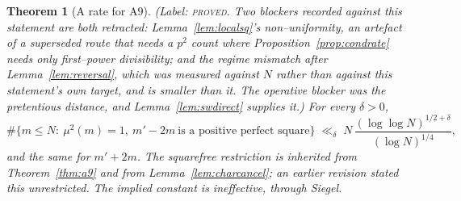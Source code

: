\documentclass[11pt]{article}
\newtheorem{theorem}{Theorem}[section]
\theoremstyle{definition}
\begin{document}
\begin{theorem}[A rate for $\mathrm{A}9$]\label{cor:a9rate}
\textup{(Label: \textsc{proved}. Two blockers recorded against this statement are both retracted: Lemma~\ref{lem:localsq}'s
non--uniformity, an artefact of a superseded route that needs a $p^2$ count where
Proposition~\ref{prop:condrate} needs only first--power divisibility; and the regime mismatch after
Lemma~\ref{lem:reversal}, which was measured against $N$ rather than against this statement's own
target, and is smaller than it. The operative blocker was the pretentious distance, and
Lemma~\ref{lem:swdirect} supplies it.)}
For every $\delta>0$,
\[ \#\{m\le N:\ \mu^2(m)=1,\ m'-2m\ \text{is a positive perfect square}\}
    \;\ll_\delta\;N\,\frac{(\log\log N)^{1/2+\delta}}{(\log N)^{1/4}}, \]
and the same for $m'+2m$. The squarefree restriction is inherited from Theorem~\ref{thm:a9} and from
Lemma~\ref{lem:charcancel}; an earlier revision stated this unrestricted. The implied constant is
ineffective, through Siegel.
\end{theorem}
\end{document}
